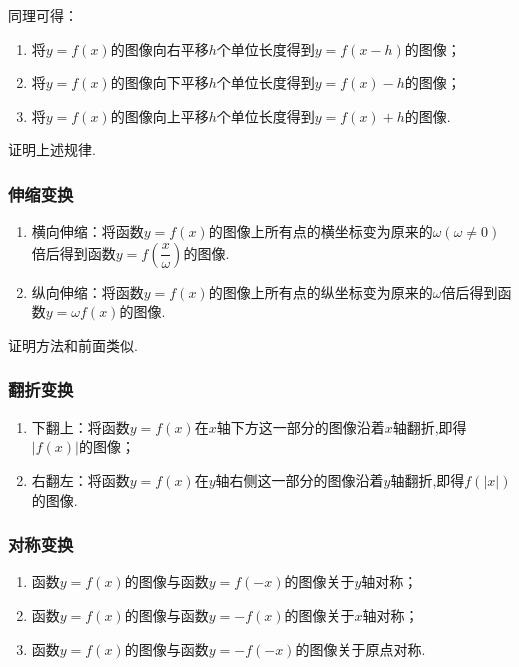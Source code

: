 \documentclass[lang=cn,math=cm,chinesefont=nofont,11pt,scheme=chinese,twocol]{elegantbook}
\begin{document}
同理可得：

\begin{enumerate}
  \item 将$y=f(x)$的图像向右平移$h$个单位长度得到$y=f(x-h)$的图像；
  \item 将$y=f(x)$的图像向下平移$h$个单位长度得到$y=f(x)-h$的图像；
  \item 将$y=f(x)$的图像向上平移$h$个单位长度得到$y=f(x)+h$的图像.
\end{enumerate}

\begin{exercise}
  证明上述规律.
\end{exercise}

\subsubsection{伸缩变换}

\begin{enumerate}
  \item 横向伸缩：将函数$y=f(x)$的图像上所有点的横坐标变为原来的$\omega(\omega\neq 0)$倍后得到函数$y=f(\dfrac{x}{\omega})$的图像.
  \item 纵向伸缩：将函数$y=f(x)$的图像上所有点的纵坐标变为原来的$\omega$倍后得到函数$y=\omega f(x)$的图像.
\end{enumerate}

证明方法和前面类似.

\subsubsection{翻折变换}

\begin{enumerate}
  \item 下翻上：将函数$y=f(x)$在$x$轴下方这一部分的图像沿着$x$轴翻折,即得$\left| f(x)\right|$的图像；
  \item 右翻左：将函数$y=f(x)$在$y$轴右侧这一部分的图像沿着$y$轴翻折,即得$f(\left| x\right|)$的图像.
\end{enumerate}

\subsubsection{对称变换}

\begin{enumerate}
  \item 函数$y=f(x)$的图像与函数$y=f(-x)$的图像关于$y$轴对称；
  \item 函数$y=f(x)$的图像与函数$y=-f(x)$的图像关于$x$轴对称；
  \item 函数$y=f(x)$的图像与函数$y=-f(-x)$的图像关于原点对称.
\end{enumerate}
\end{document}
